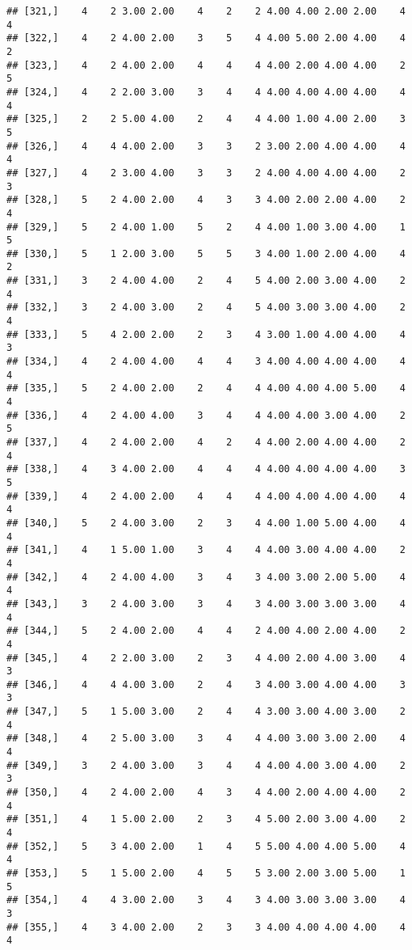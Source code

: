 \documentclass[]{article}
\begin{document}
\begin{verbatim}
## [321,]    4    2 3.00 2.00    4    2    2 4.00 4.00 2.00 2.00    4    4
## [322,]    4    2 4.00 2.00    3    5    4 4.00 5.00 2.00 4.00    4    2
## [323,]    4    2 4.00 2.00    4    4    4 4.00 2.00 4.00 4.00    2    5
## [324,]    4    2 2.00 3.00    3    4    4 4.00 4.00 4.00 4.00    4    4
## [325,]    2    2 5.00 4.00    2    4    4 4.00 1.00 4.00 2.00    3    5
## [326,]    4    4 4.00 2.00    3    3    2 3.00 2.00 4.00 4.00    4    4
## [327,]    4    2 3.00 4.00    3    3    2 4.00 4.00 4.00 4.00    2    3
## [328,]    5    2 4.00 2.00    4    3    3 4.00 2.00 2.00 4.00    2    4
## [329,]    5    2 4.00 1.00    5    2    4 4.00 1.00 3.00 4.00    1    5
## [330,]    5    1 2.00 3.00    5    5    3 4.00 1.00 2.00 4.00    4    2
## [331,]    3    2 4.00 4.00    2    4    5 4.00 2.00 3.00 4.00    2    4
## [332,]    3    2 4.00 3.00    2    4    5 4.00 3.00 3.00 4.00    2    4
## [333,]    5    4 2.00 2.00    2    3    4 3.00 1.00 4.00 4.00    4    3
## [334,]    4    2 4.00 4.00    4    4    3 4.00 4.00 4.00 4.00    4    4
## [335,]    5    2 4.00 2.00    2    4    4 4.00 4.00 4.00 5.00    4    4
## [336,]    4    2 4.00 4.00    3    4    4 4.00 4.00 3.00 4.00    2    5
## [337,]    4    2 4.00 2.00    4    2    4 4.00 2.00 4.00 4.00    2    4
## [338,]    4    3 4.00 2.00    4    4    4 4.00 4.00 4.00 4.00    3    5
## [339,]    4    2 4.00 2.00    4    4    4 4.00 4.00 4.00 4.00    4    4
## [340,]    5    2 4.00 3.00    2    3    4 4.00 1.00 5.00 4.00    4    4
## [341,]    4    1 5.00 1.00    3    4    4 4.00 3.00 4.00 4.00    2    4
## [342,]    4    2 4.00 4.00    3    4    3 4.00 3.00 2.00 5.00    4    4
## [343,]    3    2 4.00 3.00    3    4    3 4.00 3.00 3.00 3.00    4    4
## [344,]    5    2 4.00 2.00    4    4    2 4.00 4.00 2.00 4.00    2    4
## [345,]    4    2 2.00 3.00    2    3    4 4.00 2.00 4.00 3.00    4    3
## [346,]    4    4 4.00 3.00    2    4    3 4.00 3.00 4.00 4.00    3    3
## [347,]    5    1 5.00 3.00    2    4    4 3.00 3.00 4.00 3.00    2    4
## [348,]    4    2 5.00 3.00    3    4    4 4.00 3.00 3.00 2.00    4    4
## [349,]    3    2 4.00 3.00    3    4    4 4.00 4.00 3.00 4.00    2    3
## [350,]    4    2 4.00 2.00    4    3    4 4.00 2.00 4.00 4.00    2    4
## [351,]    4    1 5.00 2.00    2    3    4 5.00 2.00 3.00 4.00    2    4
## [352,]    5    3 4.00 2.00    1    4    5 5.00 4.00 4.00 5.00    4    4
## [353,]    5    1 5.00 2.00    4    5    5 3.00 2.00 3.00 5.00    1    5
## [354,]    4    4 3.00 2.00    3    4    3 4.00 3.00 3.00 3.00    4    3
## [355,]    4    3 4.00 2.00    2    3    3 4.00 4.00 4.00 4.00    4    4

\end{verbatim}
\end{document}
